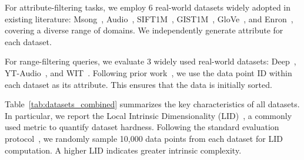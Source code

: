 \documentclass[sigconf, nonacm]{acmart}
\begin{document}
For attribute-filtering tasks, we employ 6 real-world datasets widely adopted in existing literature: Msong~\cite{msong2011}, Audio~\cite{audio_unknown}, SIFT1M~\cite{sift2010}, GIST1M~\cite{sift2010}, GloVe~\cite{GloVe2015}, and Enron~\cite{enron2015}, covering a diverse range of domains. We independently generate attribute for each dataset.


For range-filtering queries, we evaluate 3 widely used real-world datasets: Deep~\cite{yandex_deep_dataset}, YT-Audio~\cite{youtube8m_dataset}, and WIT~\cite{wit_dataset}. Following prior work~\cite{DSG}, we use the data point ID within each dataset as its attribute. This ensures that the data is initially sorted.

Table~\ref{tab:datasets_combined} summarizes the key characteristics of all datasets. In particular, we report the Local Intrinsic Dimensionality (LID)~\cite{Lid}, a commonly used metric to quantify dataset hardness. Following the standard evaluation protocol~\cite{LID2}, we randomly sample 10,000 data points from each dataset for LID computation. A higher LID indicates greater intrinsic complexity.

\setlength{\textfloatsep}{0.1cm}
\setlength{\floatsep}{0cm}
\begin{table}[t]
\centering

\setlength{\abovecaptionskip}{0.05cm}
\setlength{\textfloatsep}{0.cm}
\caption{Datassets}

\label{tab:datasets_combined}
\end{table}
\end{document}
